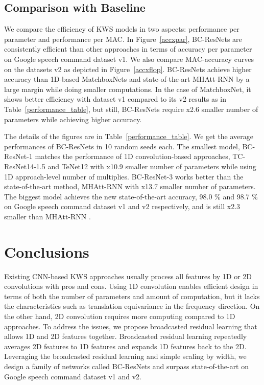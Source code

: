 \documentclass[a4paper]{article}
\begin{document}
\subsection{Comparison with Baseline}

We compare the efficiency of KWS models in two aspects: performance per parameter and performance per MAC. In Figure~\ref{accxpar}, BC-ResNets are consistently efficient than other approaches in terms of accuracy per parameter on Google speech command dataset v1. We also compare MAC-accuracy curves on the datasets v2 as depicted in Figure~\ref{accxflop}. BC-ResNets achieve higher accuracy than 1D-based MatchboxNets \cite{matchbox} and state-of-the-art MHAtt-RNN \cite{mhatt-rnn} by a large margin while doing smaller computations. In the case of MatchboxNet, it shows better efficiency with dataset v1 compared to its v2 results as in Table~\ref{performance_table}, but still, BC-ResNets require x2.6 smaller number of parameters while achieving higher accuracy.

The details of the figures are in Table~\ref{performance_table}. We get the average performances of BC-ResNets in 10 random seeds each. The smallest model, BC-ResNet-1 matches the performance of 1D convolution-based approaches, TC-ResNet14-1.5 \cite{tcresnet} and TeNet12 \cite{tenet} with x10.9 smaller number of parameters while using 1D approach-level number of multiplies. BC-ResNet-3 works better than the state-of-the-art method, MHAtt-RNN \cite{mhatt-rnn} with x13.7 smaller number of parameters. The biggest model achieves the new state-of-the-art accuracy, 98.0 \% and 98.7 \% on Google speech command dataset v1 and v2 respectively, and is still x2.3 smaller than MHAtt-RNN \cite{mhatt-rnn}.

\section{Conclusions}

Existing CNN-based KWS approaches usually process all features by 1D or 2D convolutions with pros and cons. Using 1D convolution enables efficient design in terms of both the number of parameters and amount of computation, but it lacks the characteristics such as translation equivariance in the frequency direction. On the other hand, 2D convolution requires more computing compared to 1D approaches. To address the issues, we propose broadcasted residual learning that allows 1D and 2D features together. Broadcasted residual learning repeatedly averages 2D features to 1D features and expands 1D features back to the 2D. Leveraging the broadcasted residual learning and simple scaling by width, we design a family of networks called BC-ResNets and surpass state-of-the-art on Google speech command dataset v1 and v2.




\end{document}
